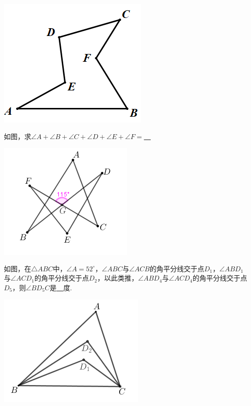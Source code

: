 \documentclass[10pt,twocolumn]{ctexart}
\begin{document}
 \includegraphics[scale=0.5]{figure/feibiao05.PNG}

\begin{example}
如图，求$\angle A+\angle B+\angle C+\angle D+\angle E+\angle F=$\underline{~\hspace{1cm}~}
\end{example}

 \includegraphics[scale=0.5]{figure/feibiao06.PNG}

\begin{example}
如图，在$\triangle ABC$中，$\angle A=52^\circ$，$\angle ABC$与$\angle ACB$的角平分线交于点$D_1$，$\angle ABD_1$与$\angle ACD_1$的角平分线交于点$D_2$，以此类推，$\angle ABD_4$与$\angle ACD_4$的角平分线交于点$D_5$，则$\angle BD_5C$是\underline{~\hspace{1cm}~}度.
\end{example}

 \includegraphics[scale=0.6]{figure/feibiao07.PNG}
\end{document}
